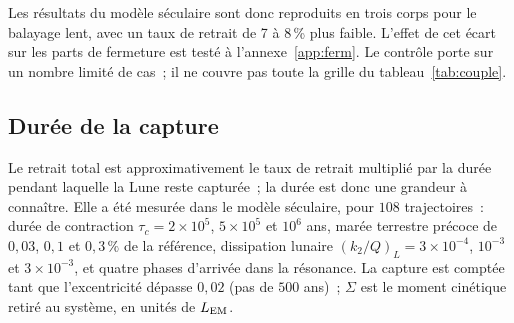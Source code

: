 \documentclass[11pt,a4paper]{article}
\newcommand{\LEM}{\ensuremath{L_{\rm EM}}}
\begin{document}
Les résultats du modèle séculaire sont donc reproduits en trois corps pour le balayage lent, avec un taux de retrait de 7 à 8\,\% plus faible. L'effet de cet écart sur les parts de fermeture est testé à l'annexe~\ref{app:ferm}. Le contrôle porte sur un nombre limité de cas~; il ne couvre pas toute la grille du tableau~\ref{tab:couple}.

\subsection{Durée de la capture}

Le retrait total est approximativement le taux de retrait multiplié par la durée pendant laquelle la Lune reste capturée~; la durée est donc une grandeur à connaître. Elle a été mesurée dans le modèle séculaire, pour $108$ trajectoires~: durée de contraction $\tau_c=2\times10^5$, $5\times10^5$ et $10^6$ ans, marée terrestre précoce de $0{,}03$, $0{,}1$ et $0{,}3\,\%$ de la référence, dissipation lunaire $(k_2/Q)_L=3\times10^{-4}$, $10^{-3}$ et $3\times10^{-3}$, et quatre phases d'arrivée dans la résonance. La capture est comptée tant que l'excentricité dépasse $0{,}02$ (pas de $500$ ans)~; $\Sigma$ est le moment cinétique retiré au système, en unités de $\LEM$.
\end{document}
